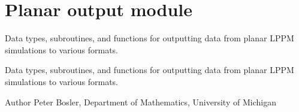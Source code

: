 \hypertarget{group__PlaneOutput}{\section{Planar output module}
\label{group__PlaneOutput}
}


Data types, subroutines, and functions for outputting data from planar L\+P\+P\+M simulations to various formats.  


Data types, subroutines, and functions for outputting data from planar L\+P\+P\+M simulations to various formats. 

\begin{DoxyAuthor}{Author}
Peter Bosler, Department of Mathematics, University of Michigan 
\end{DoxyAuthor}
